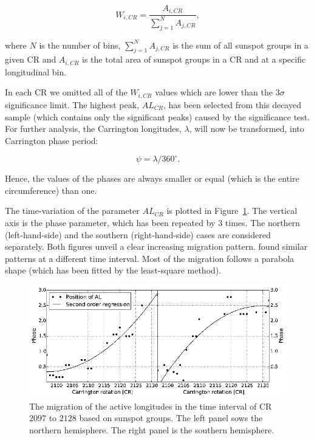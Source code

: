 \begin{equation}
W_{i,CR} = \frac{A_{i,CR}}{ \sum_{j=1}^{N} A_{j,CR} },
\end{equation}

where $N$ is the number of bins, $\sum_{j=1}^{N} A_{j,CR}$  is the sum of all sunspot groups in a given CR and $A_{i,CR}$ is the  total area of sunspot groups in a CR and at a specific longitudinal bin.

In each CR we omitted all of the $ W_{i,CR}$ values which are lower than the $3\sigma$ significance limit. The highest peak, $AL_{CR}$, has been selected from this decayed sample (which contains only the significant peaks) caused by the significance test. For further analysis, the Carrington longitudes, $\lambda$, will now be transformed, into Carrington phase period: 

\begin{equation}
\psi = \lambda/360^{\circ}.
\end{equation}

Hence, the values of the phases are always smaller or equal (which is the entire circumference) than one. 

The time-variation of the parameter $AL_{CR}$ is plotted in Figure~\ref{AL}. The vertical axis is the phase parameter, which has been repeated by $3$ times.
The northern (left-hand-side) and the southern (right-hand-side) cases are considered separately. Both figures unveil a clear increasing migration pattern. \cite{Usoskin2005,Gyenge2014} found similar patterns at a different time interval. Most of the migration follows a parabola shape (which has been fitted by the least-square method).

\begin{figure}
	\centering
	\includegraphics[width=128mm]{Chapter4/Figs/AL}
	\caption{The migration of the active longitudes in the time interval of CR $2097$ to $2128$ based on sunspot groups. The left panel sows the northern hemisphere. The right panel is the southern hemisphere.}
	\label{AL}
\end{figure}

